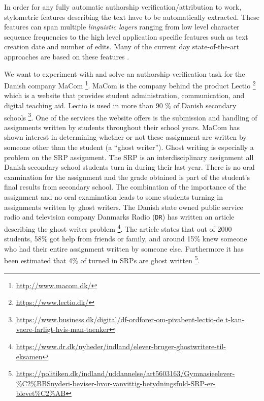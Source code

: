 In order for any fully automatic authorship verification/attribution to work,
stylometric features describing the text have to be automatically extracted.
These features can span multiple \textit{linguistic layers} ranging from low
level character sequence frequencies to the high level application specific
features such as text creation date and number of edits. Many of the current day
state-of-the-art approaches are based on these features \citep{stamatos2009}.


We want to experiment with and solve an authorship verification task for the
Danish company MaCom \footnote{\url{http://www.macom.dk/}}. MaCom is the company
behind the product Lectio \footnote{\url{https://www.lectio.dk/}} which is
a website that provides student administration, communication, and digital
teaching aid. Lectio is used in more than 90 \% of Danish secondary schools
\footnote{\url{https://www.business.dk/digital/df-ordforer-om-pivabent-lectio-de
t-kan-vaere-farligt-hvis-man-taenker}}. One of the services the website offers
is the submission and handling of assignments written by students throughout
their school years. MaCom has shown interest in determining whether or not these
assignment are written by someone other than the student (a ``ghost writer'').
Ghost writing is especially a problem on the \gls{SRP} assignment. The \gls{SRP}
is an interdisciplinary assignment all Danish secondary school students turn in
during their last year. There is no oral examination for the assignment and the
grade obtained is part of the student's final results from secondary school.
The combination of the importance of the assignment and no oral examination
leads to some students turning in assignments written by ghost writers. The
Danish state owned public service radio and television company Danmarks Radio
(\texttt{DR}) has written an article describing the ghost writer problem
\footnote{\url{https://www.dr.dk/nyheder/indland/elever-bruger-ghostwritere-til-
eksamen}}. The article states that out of 2000 students, 58\% got
help from friends or family, and around 15\% knew someone who had
their entire assignment written by someone else. Furthermore it has
been estimated that 4\% of turned in \glspl{SRP} are ghost written
\footnote{\url{https://politiken.dk/indland/uddannelse/art5603163/Gymnasieelever-\%C2\%BBSnyderi-beviser-hvor-vanvittig-betydningsfuld-SRP-er-blevet\%C2\%AB}}.

